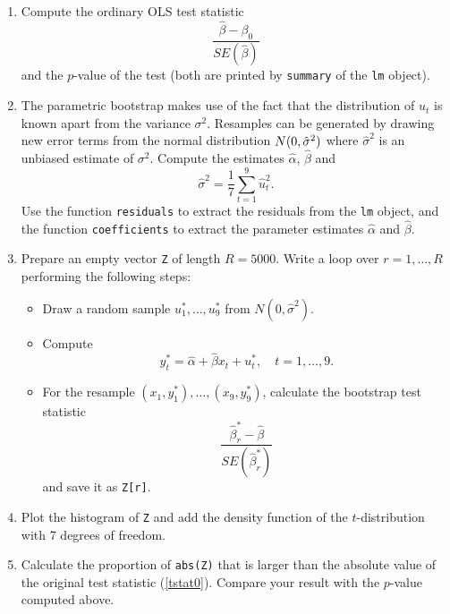 \documentclass{article}
\begin{document}
\begin{enumerate}
\item Compute the ordinary OLS test statistic%
\begin{equation}
\frac{\hat{\beta}-\beta _{0}}{SE(\hat{\beta})}  \label{tstat0}
\end{equation}%
and the $p$-value of the test (both are printed by \texttt{summary} of the
\texttt{lm} object).

\item The parametric bootstrap makes use of the fact that the distribution
of $u_{t}$ is known apart from the variance $\sigma ^{2}$. Resamples can be
generated by drawing new error terms from the normal distribution $N(0,\hat{%
\sigma}^{2})$ where $\hat{\sigma}^{2}$ is an unbiased estimate of $\sigma
^{2}$. Compute the estimates $\hat{\alpha}$, $\hat{\beta}$ and%
\begin{equation*}
\hat{\sigma}^{2}=\frac{1}{7}\sum_{t=1}^{9}\hat{u}_{t}^{2}.
\end{equation*}%
Use the function \texttt{residuals} to extract the residuals from the
\texttt{lm} object, and the function \texttt{coefficients} to extract the
parameter estimates $\hat{\alpha}$ and $\hat{\beta}$.

\item Prepare an empty vector \texttt{Z} of length $R=5000$. Write a loop
over $r=1,\ldots ,R$ performing the following steps:

\begin{itemize}
\item Draw a random sample $u_{1}^{\ast },\ldots ,u_{9}^{\ast }$ from $N(0,%
\hat{\sigma}^{2})$.

\item Compute%
\begin{equation*}
y_{t}^{\ast }=\hat{\alpha}+\hat{\beta}x_{t}+u_{t}^{\ast },\quad t=1,\ldots
,9.
\end{equation*}

\item For the resample $\left( x_{1},y_{1}^{\ast }\right) ,\ldots ,\left(
x_{9},y_{9}^{\ast }\right) $, calculate the bootstrap test statistic
\begin{equation*}
\frac{\hat{\beta}_{r}^{\ast }-\hat{\beta}}{SE(\hat{\beta}_{r}^{\ast })}
\end{equation*}
and save it as \texttt{Z[r]}.
\end{itemize}

\item Plot the histogram of \texttt{Z} and add the density function of the $%
t $-distribution with 7 degrees of freedom.

\item Calculate the proportion of \texttt{abs(Z)} that is larger than the
absolute value of the original test statistic (\ref{tstat0}). Compare your
result with the $p$-value computed above.
\end{enumerate}
\end{document}

